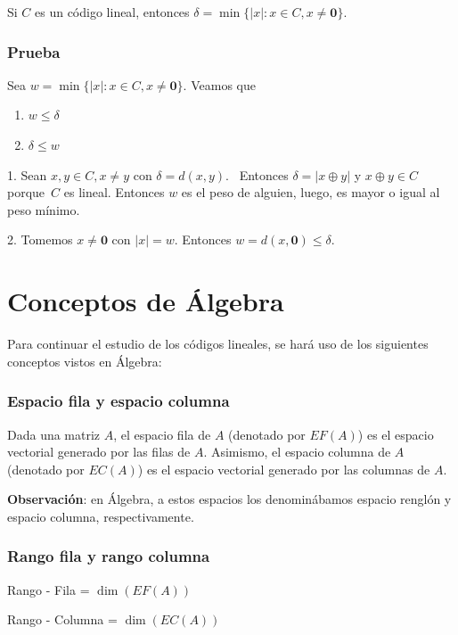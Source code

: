 \documentclass[10pt,a4paper]{article}
\begin{document}
Si $C$ es un código lineal, entonces $\delta = \min \{\lvert x\rvert: x \in C, x \neq \textbf{0}\}$.

\subsubsection*{Prueba}

Sea $w = \min \{\lvert x\rvert: x \in C, x \neq \textbf{0}\}$. Veamos que

\begin{enumerate}

	\item $w \leq \delta$
	\item $\delta \leq w$
\end{enumerate}

1. Sean $x, y \in C, x \neq y$ con $\delta = d(x, y)$.  Entonces $\delta = \lvert x \oplus y \rvert$ y $x \oplus y \in C$ porque $C$ es lineal. Entonces $w$ es el peso de alguien, luego, es mayor o igual al peso mínimo.

2. Tomemos $x \neq \textbf{0}$ con $\lvert x \rvert = w$. Entonces $w = d(x, \textbf{0}) \leq \delta$.

\section*{Conceptos de Álgebra}

Para continuar el estudio de los códigos lineales, se hará uso de los siguientes conceptos vistos en Álgebra:

\subsubsection*{Espacio fila y espacio columna}

Dada una matriz $A$, el espacio fila de $A$ (denotado por $EF(A)$) es el espacio vectorial generado por las filas de $A$. Asimismo, el espacio columna de $A$ (denotado por $EC(A)$) es el espacio vectorial generado por las columnas de $A$.

\textbf{Observación}: en Álgebra, a estos espacios los denominábamos espacio renglón y espacio columna, respectivamente.

\subsubsection*{Rango fila y rango columna}

Rango - Fila = $\dim(EF(A))$

Rango - Columna = $\dim(EC(A))$
\end{document}
